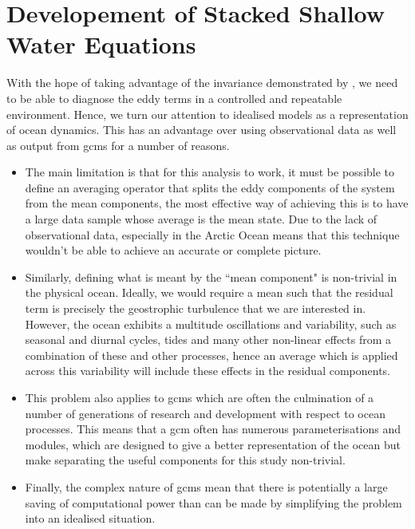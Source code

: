 \documentclass[10pt,a4paper]{article}
\begin{document}
\section{Developement of Stacked Shallow Water Equations}

With the hope of taking advantage of the invariance demonstrated by 
\cite{maddison2013eliassen}, we need to be able to diagnose the
eddy terms in a controlled and repeatable environment. Hence, we turn our attention to
idealised models as a representation of ocean dynamics. This has an advantage 
over using observational data as well as output from \glspl{gcm} for a number of reasons.
\begin{itemize}
	\item The main limitation is that for this analysis to work, it must be possible to define an
	averaging operator that splits the eddy components of the system from the mean
	components, the most effective way of achieving this is to have a large data sample
	whose average is the mean state. Due to the lack of observational data, especially in the
	Arctic Ocean means that this  technique wouldn't be able to achieve an accurate or complete
	picture. 
	\item Similarly, defining what is meant by the ``mean component" is non-trivial in the physical ocean. Ideally, we would require a mean such that the residual term is precisely the 
	geostrophic turbulence that we are interested in. However, the ocean exhibits a multitude 
	oscillations and variability, such as seasonal and diurnal cycles, tides and many other
	non-linear effects from a combination of these and other processes, hence an average which
	is applied across this variability will include these effects in the residual components.
	\item This problem also applies to \glspl{gcm} which are often the culmination of 
	a number of generations of research and development with respect to ocean processes.
	This means that a \gls{gcm} often has numerous parameterisations and modules, which are
	designed to give a better representation of the ocean but make separating the useful components
	for this study non-trivial. 
	\item Finally, the complex nature of \glspl{gcm} mean that there is potentially a large saving
	of computational power than can be made by simplifying the problem into an idealised situation.
\end{itemize}
\end{document}
